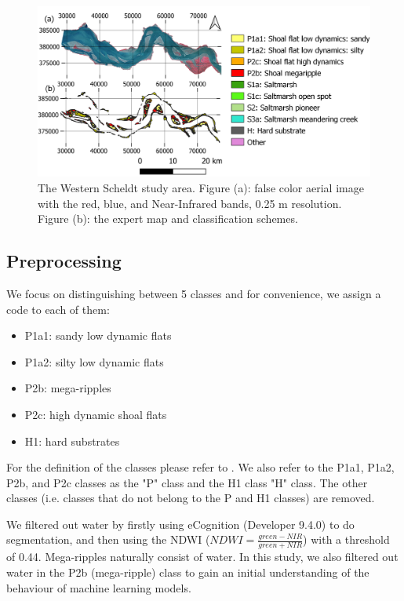 \documentclass{isprs} %
\begin{document}
\begin{figure}
    \centering
    \includegraphics[scale=0.4]{figures/westernscheldt_overview.png}
    \caption{The Western Scheldt study area. Figure (a): false color aerial image with the red, blue, and Near-Infrared bands, 0.25 m resolution. Figure (b): the expert map and classification schemes.}
    \label{fig:ws_o}
\end{figure}


\subsection{Preprocessing}

We focus on distinguishing between 5 classes and for convenience, we assign a code to each of them: 
\begin{itemize} 
\item P1a1: sandy low dynamic flats  
\item P1a2: silty low dynamic flats 
\item P2b:  mega-ripples
\item P2c: high dynamic shoal flats
\item H1: hard substrates
\end{itemize} 

For the definition of the classes please refer to \cite{Douma2019}. We also refer to the P1a1, P1a2, P2b, and P2c classes as the "P" class and the H1 class "H" class. The other classes (i.e. classes that do not belong to the P and H1 classes) are removed. 

We filtered out water by firstly using eCognition (Developer 9.4.0) to do segmentation, and then using the NDWI ($NDWI = \frac{green - NIR}{green + NIR}$) with a threshold of 0.44. Mega-ripples naturally consist of water. In this study, we also filtered out water in the P2b (mega-ripple) class to gain an initial understanding of the behaviour of machine learning models.   
\end{document}
